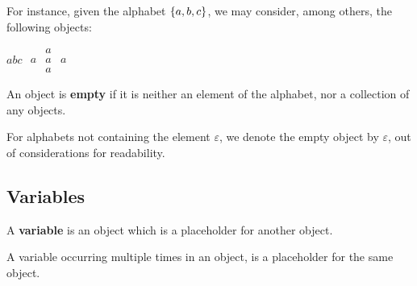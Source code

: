 For instance, given the alphabet $\left\{{a,b,c}\right\}$, we may consider, among
others, the following objects:

\begin{center}
$abc$
\quad\quad\quad
$\begin{matrix}
  & a &   \\
a & a & a \\
  & a &
\end{matrix}$
\quad\quad\quad
{}

\end{center}

\begin{definition}

An object is \textbf{empty} if it is neither an element of the alphabet, nor a
collection of any objects.

\end{definition}

\begin{notation}

For alphabets not containing the element $\varepsilon$, we denote the empty
object by $\varepsilon$, out of considerations for readability.

\end{notation}

\subsection{Variables}

\begin{definition}

A \textbf{variable} is an object which is a placeholder for another object.

\end{definition}

\begin{definition}

A variable occurring multiple times in an object, is a placeholder for the same
object.

\end{definition}


